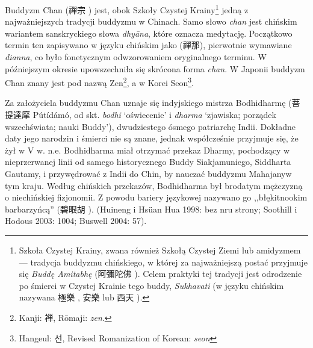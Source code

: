 \introduction
Buddyzm Chan (禪宗 ) jest, obok Szkoły Czystej Krainy\footnote{Szkoła Czystej Krainy, zwana również Szkołą Czystej Ziemi lub amidyzmem --- tradycja buddyzmu chińskiego, w której za najważniejszą postać przyjmuje się \textit{Buddę Amitabhę} (阿彌陀佛 ). Celem praktyki tej tradycji jest odrodzenie po śmierci w Czystej Krainie tego buddy, \textit{Sukhavati} (w języku chińskim nazywana 極樂 , 安樂  lub 西天 ).} %
 jedną z najważniejszych tradycji buddyzmu w Chinach. Samo słowo \textit{chan} jest chińskim wariantem %
sanskryckiego słowa \textit{dhyāna}, które oznacza medytację.
Początkowo termin ten zapisywano w języku chińskim jako  (禪那), pierwotnie wymawiane \textit{dianna}, co było fonetycznym odwzorowaniem oryginalnego terminu. W późniejszym okresie upowszechniła się skrócona forma \textit{chan}. W Japonii buddyzm Chan znany jest pod nazwą Zen\footnote{Kanji: {\ipaexgothic 禅}, Rōmaji: \textit{zen}.}, a w Korei Seon\footnote{Hangeul: {\Korean 선}, Revised Romanization of Korean: \textit{seon}}.

Za założyciela buddyzmu Chan uznaje się indyjskiego mistrza Bodhidharmę (菩提達摩 Pútídámó, od skt. \textit{bodhi} `oświecenie' i \textit{dharma} `zjawiska; porządek wszechświata; nauki Buddy'), dwudziestego ósmego patriarchę Indii. Dokładne daty jego narodzin i śmierci nie są znane, jednak współcześnie przyjmuje się, że żył w V w. n.e. Bodhidharma miał otrzymać przekaz Dharmy, pochodzący w nieprzerwanej linii od samego historycznego Buddy Siakjamuniego, Siddharta Gautamy, i przywędrować z Indii do Chin, by nauczać buddyzmu Mahajany\fnm w tym kraju. Według chińskich przekazów, Bodhidharma był brodatym mężczyzną o niechińskiej fizjonomii. Z powodu bariery językowej nazywano go ,,błękitnookim barbarzyńcą'' (碧眼胡 ). (Huineng i Hsüan Hua 1998: bez nru strony; Soothill i Hodous 2003: 1004; Buswell 2004: 57).
%

